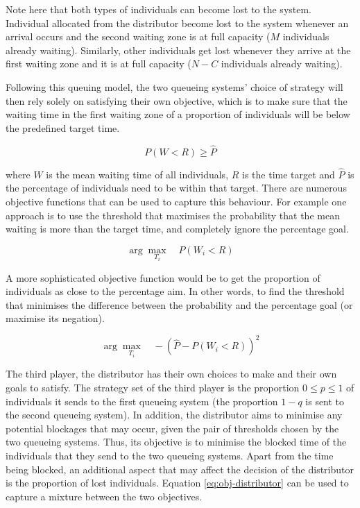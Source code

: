 Note here that both types of individuals can become lost to the system. 
Individual allocated from the distributor become lost to the system whenever 
an arrival occurs and the second waiting zone is at full capacity (\(M\) 
individuals already waiting).
Similarly, other individuals get lost whenever they arrive at the first waiting 
zone and it is at full capacity (\(N - C\) individuals already waiting).

Following this queuing model, the two queueing systems' choice of strategy will 
then rely solely on satisfying their own 
objective, which is to make sure that the waiting time in the first waiting zone 
of a proportion of individuals will be below the predefined target time.

\begin{equation}
    P(W < R) \geq \hat{P}
\end{equation}

where \(W\) is the mean waiting time of all individuals, \(R\) is the time 
target and \(\hat{P}\) is the percentage of individuals need to be within that 
target. 
There are numerous objective functions that can be used to capture this 
behaviour. 
For example one approach is to use the threshold that maximises the probability 
that 
the mean waiting is more than the target time, and completely ignore the 
percentage goal.

\begin{equation}
    \arg \max_{T_i} \quad P(W_i < R)
\end{equation}

A more sophisticated objective function would be to get the proportion 
of individuals as close to the percentage aim. 
In other words, to find the threshold that minimises the difference between the 
probability and the percentage goal (or maximise its negation).

\begin{equation}\label{eq:obj-queueing-systems}
    \arg \max_{T_i} \quad -\left( \hat{P} - P(W_i < R) \right)^2
\end{equation}


The third player, the distributor has their own choices to make and their own 
goals to satisfy.
The strategy set of the third player is the proportion \(0 \leq p \leq 1\) of 
individuals it sends to the first queueing system (the proportion \(1 - q\) is 
sent to the second queueing system).
In addition, the distributor aims to minimise any potential blockages
that may occur, given the pair of thresholds chosen by the two queueing systems.
Thus, its objective is to minimise the blocked time of the individuals 
that they send to the two queueing systems.
Apart from the time being blocked, an additional aspect that may affect the 
decision of the distributor is the proportion of lost individuals.
Equation \ref{eq:obj-distributor} can be used to capture a mixture 
between the two objectives.

